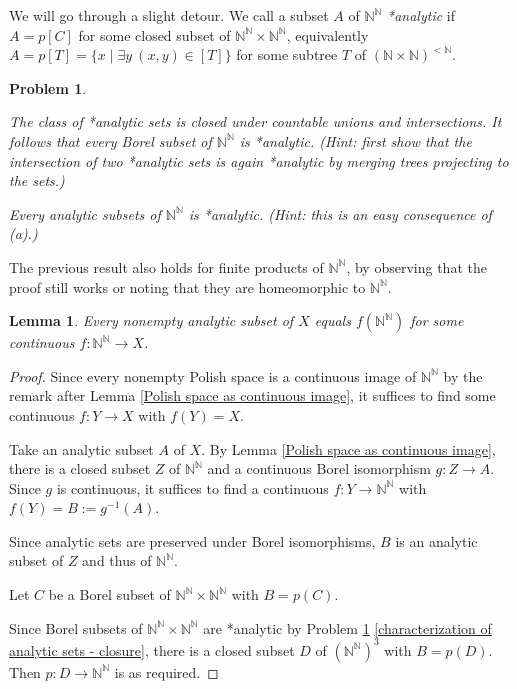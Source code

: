 \documentclass[10pt]{amsart}
\newcommand{\NN}{\mathbb{N}}
\newtheorem{lemma}[theorem]{Lemma}
\newtheorem{problem}[theorem]{Problem}
\theoremstyle{definition}
\theoremstyle{remark}
\newenvironment{enumerate-(a)}{\begin{enumerate}[label={\upshape (\alph*)}, leftmargin=2pc]}{\end{enumerate}}
\begin{document}
We will go through a slight detour. 
We call a subset $A$ of $\NN^\NN$ \emph{*analytic} if $A=p[C]$ for some closed subset of $\NN^\NN\times \NN^\NN$, equivalently $A=p[T]=\{x\mid \exists y\ (x,y)\in [T]\}$ for some subtree $T$ of $(\NN\times\NN)^{<\NN}$. 

\begin{problem} \label{characterization of analytic sets} 
\begin{enumerate-(a)} 
\item \label{characterization of analytic sets - closure} 
The class of *analytic sets is closed under countable unions and intersections. It follows that every Borel subset of $\NN^\NN$ is *analytic. 
\emph{(Hint: first show that the intersection of two *analytic sets is again *analytic by merging trees projecting to the sets.) } 
\item 
Every analytic subsets of $\NN^\NN$ is *analytic. 
\emph{(Hint: this is an easy consequence of (a).) } 
\end{enumerate-(a)} 
\end{problem} 

The previous result also holds for finite products of $\NN^\NN$, by observing that the proof still works or noting that they are homeomorphic to $\NN^\NN$. 

\begin{lemma} 
Every nonempty analytic subset of $X$ equals $f(\NN^\NN)$ for some continuous $f\colon \NN^\NN\rightarrow X$. 
\end{lemma} 
\begin{proof} 
Since every nonempty Polish space is a continuous image of $\NN^\NN$ by the remark after Lemma \ref{Polish space as continuous image}, it suffices to find some continuous $f\colon Y\rightarrow X$ with $f(Y)=X$. 

Take an analytic subset $A$ of $X$. By Lemma \ref{Polish space as continuous image}, there is a closed subset $Z$ of $\NN^\NN$ and a continuous Borel isomorphism $g\colon Z\rightarrow A$. 
Since $g$ is continuous, it suffices to find a continuous $f\colon Y\rightarrow \NN^\NN$ with $f(Y)=B:=g^{-1}(A)$. 

Since analytic sets are preserved under Borel isomorphisms, $B$ is an analytic subset of $Z$ and thus of $\NN^\NN$. 


Let $C$ be a Borel subset of $\NN^\NN\times \NN^\NN$ with $B=p(C)$. 

Since Borel subsets of $\NN^\NN\times \NN^\NN$ are *analytic by Problem \ref{characterization of analytic sets} \ref{characterization of analytic sets - closure}, there is a closed subset $D$ of $(\NN^\NN)^3$ with $B=p(D)$. 
Then $p\colon D\rightarrow \NN^\NN$ is as required. 
\end{proof} 
\end{document}
